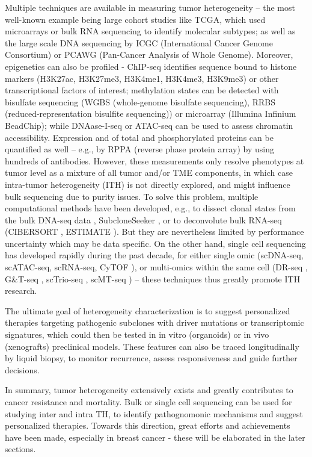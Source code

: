 Multiple techniques are available in measuring tumor heterogeneity – the most well-known example being large cohort studies like TCGA, which used microarrays or bulk RNA sequencing to identify molecular subtypes; as well as the large scale DNA sequencing by ICGC (International Cancer Genome Consortium) or PCAWG (Pan-Cancer Analysis of Whole Genome). Moreover, epigenetics can also be profiled - ChIP-seq identifies sequence bound to histone markers (H3K27ac, H3K27me3, H3K4me1, H3K4me3, H3K9me3) or other transcriptional factors of interest; methylation states can be detected with bisulfate sequencing (WGBS (whole-genome bisulfate sequencing), RRBS (reduced-representation bisulfite sequencing)) or microarray (Illumina Infinium BeadChip); while DNAase-I-seq or ATAC-seq can be used to assess chromatin accessibility. Expression and of total and phosphorylated proteins can be quantified as well – e.g., by RPPA (reverse phase protein array) by using hundreds of antibodies. However, these measurements only resolve phenotypes at tumor level as a mixture of all tumor and/or TME components, in which case intra-tumor heterogeneity (ITH) is not directly explored, and might influence bulk sequencing due to purity issues. To solve this problem, multiple computational methods have been developed, e.g., to dissect clonal states from the bulk DNA-seq data \citep{roth2014pyclone}, SubcloneSeeker \citep{qiao2014subcloneseeker}, or to deconvolute bulk RNA-seq (CIBERSORT \citep{chen2018profiling}, ESTIMATE \citep{yoshihara2013inferring}). But they are nevertheless limited by performance uncertainty which may be data specific. On the other hand, single cell sequencing has developed rapidly during the past decade, for either single omic (scDNA-seq, scATAC-seq, scRNA-seq, CyTOF \citep{bendall2011single}), or multi-omics within the same cell (DR-seq \citep{dey2015integrated}, G\&T-seq \citep{macaulay2015g}, scTrio-seq \citep{hou2016single}, scMT-seq \citep{hu2016simultaneous}) – these techniques thus greatly promote ITH research. 

The ultimate goal of heterogeneity characterization is to suggest personalized therapies targeting pathogenic subclones with driver mutations or transcriptomic signatures, which could then be tested in in vitro (organoids) or in vivo (xenografts) preclinical models. These features can also be traced longitudinally by liquid biopsy, to monitor recurrence, assess responsiveness and guide further decisions.

In summary, tumor heterogeneity extensively exists and greatly contributes to cancer resistance and mortality. Bulk or single cell sequencing can be used for studying inter and intra TH, to identify pathognomonic mechanisms and suggest personalized therapies. Towards this direction, great efforts and achievements have been made, especially in breast cancer - these will be elaborated in the later sections.

